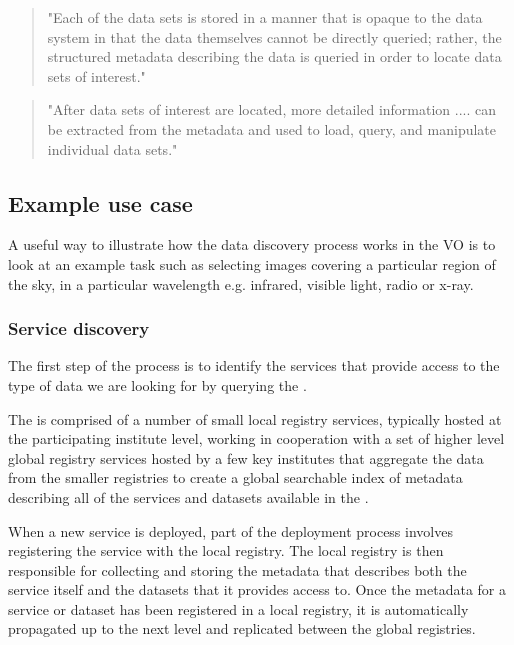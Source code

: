 \documentclass{article}
\begin{document}
\begin{quote}
"Each of the data sets is stored in a manner that is opaque to the data
system in that the data themselves cannot be directly queried; rather,
the structured metadata describing the data is queried in order to locate
data sets of interest."
\end{quote}

\begin{quote}
"After data sets of interest are located, more detailed information .... can
be extracted from the metadata and used to load, query, and manipulate
individual data sets."
\end{quote}

\subsection{Example use case}

A useful way to illustrate how the data discovery process works in the VO
is to look at an example task such as selecting images covering a particular
region of the sky, in a particular wavelength e.g. infrared, visible light,
radio or x-ray.

\subsubsection{Service discovery}

The first step of the process is to identify the services that provide
access to the type of data we are looking for by querying the \cite{ivoa-reg}.

The \cite{ivoa-reg} is comprised of a number of small local registry
services, typically hosted at the participating institute level, working in
cooperation with a set of higher level global registry services hosted by a
few key institutes that aggregate the data from the smaller registries to
create a global searchable index of metadata describing all of the services
and datasets available in the \cite{vo}.

When a new service is deployed, part of the deployment process involves
registering the service with the local registry.
The local registry is then responsible for collecting and storing the
metadata that describes both the service itself and the datasets that it
provides access to.
Once the metadata for a service or dataset has been registered in a local
registry, it is automatically propagated up to the next level and replicated
between the global registries.
\end{document}
